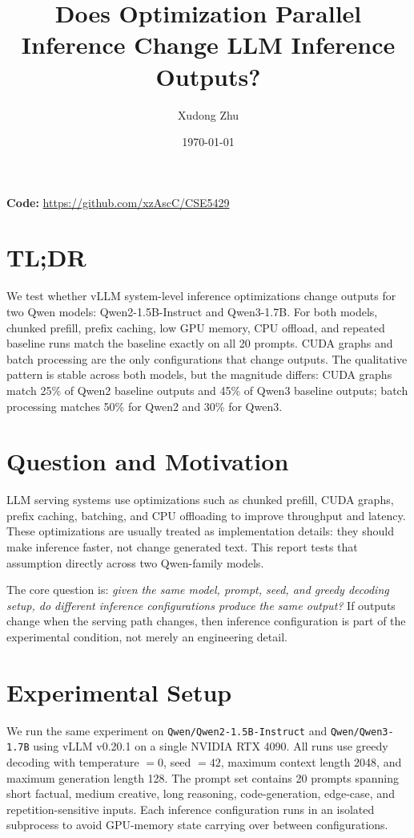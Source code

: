\documentclass[11pt, letterpaper]{article}
\title{\textbf{Does Optimization Parallel Inference Change LLM Inference Outputs?}}
\author{Xudong Zhu}
\date{\today}
\begin{document}
\maketitle

\noindent\textbf{Code:} \url{https://github.com/xzAscC/CSE5429}

\vspace{0.8em}

\section*{TL;DR}

We test whether vLLM system-level inference optimizations change outputs for
two Qwen models: Qwen2-1.5B-Instruct and Qwen3-1.7B.  For both models, chunked
prefill, prefix caching, low GPU memory, CPU offload, and repeated baseline
runs match the baseline exactly on all 20 prompts.  CUDA graphs and batch
processing are the only configurations that change outputs.  The qualitative
pattern is stable across both models, but the magnitude differs: CUDA graphs
match 25\% of Qwen2 baseline outputs and 45\% of Qwen3 baseline outputs; batch
processing matches 50\% for Qwen2 and 30\% for Qwen3.

\section{Question and Motivation}

LLM serving systems use optimizations such as chunked prefill, CUDA graphs,
prefix caching, batching, and CPU offloading to improve throughput and latency.
These optimizations are usually treated as implementation details: they should
make inference faster, not change generated text.  This report tests that
assumption directly across two Qwen-family models.

The core question is: \emph{given the same model, prompt, seed, and greedy
decoding setup, do different inference configurations produce the same output?}
If outputs change when the serving path changes, then inference configuration is
part of the experimental condition, not merely an engineering detail.

\section{Experimental Setup}

We run the same experiment on \texttt{Qwen/Qwen2-1.5B-Instruct} and
\texttt{Qwen/Qwen3-1.7B} using vLLM v0.20.1 on a single NVIDIA RTX 4090.  All
runs use greedy decoding with temperature $=0$, seed $=42$, maximum context
length 2048, and maximum generation length 128.  The prompt set contains 20
prompts spanning short factual, medium creative, long reasoning,
code-generation, edge-case, and repetition-sensitive inputs.  Each inference
configuration runs in an isolated subprocess to avoid GPU-memory state carrying
over between configurations.
\end{document}
